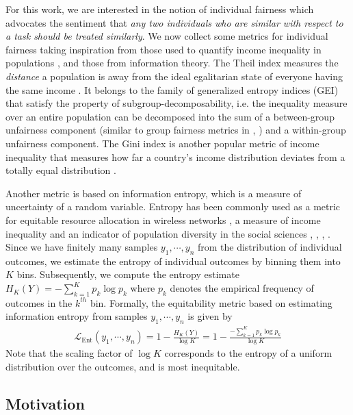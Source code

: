\documentclass[sigconf]{acmart}
\begin{document}
For this work, we are interested in the notion of individual fairness which advocates the sentiment that \textit{any two individuals who are similar with respect to a task should be treated similarly}. We now collect some metrics for individual fairness taking inspiration from those used to quantify income inequality in populations \cite{inequalityindices}, and those from information theory. The Theil index measures the \textit{distance} a population is away from the ideal egalitarian state of everyone having the same income \cite{htheil}. It belongs to the family of generalized entropy indices (GEI) that satisfy the property of subgroup-decomposability, i.e. the inequality measure over an entire population can be decomposed into the sum of a between-group unfairness component (similar to group fairness metrics in \cite{dwork2012fairness}, \cite{aif360}) and a within-group unfairness component. The Gini index is another popular metric of income inequality that measures how far a country's income distribution deviates from a totally equal distribution \cite{gini}. 

Another metric is based on information entropy, which is a measure of uncertainty of a random variable. Entropy has been commonly used as a metric for equitable resource allocation in wireless networks \cite{FairnessMetric}, a measure of income inequality and an indicator of population diversity in the social sciences \cite{segregation}, \cite{diversity}, \cite{Balch2000HierarchicSE}, \cite{TuckerThesis}. Since we have finitely many samples $y_1,\cdots,y_n$ from the distribution of individual outcomes, we estimate the entropy of individual outcomes by binning them into $K$ bins. Subsequently, we compute the entropy estimate $H_K(Y)=-\sum_{k=1}^Kp_k\log p_k$ where $p_k$ denotes the empirical frequency of outcomes in the $k^{th}$ bin. Formally, the equitability metric based on estimating information entropy from samples $y_1,\cdots,y_n$ is given by\begin{align}
    \mathcal{L}_{\mathrm{Ent}}(y_1,\cdots,y_n)=1-\frac{H_K(Y)}{\log K}=1-\frac{-\sum_{k=1}^Kp_k\log p_k}{\log K}\label{eq:ent}
\end{align}
Note that the scaling factor of $\log K$ corresponds to the entropy of a uniform distribution over the outcomes, and is most inequitable.

\subsection{Motivation\label{subsec:motivation}}
\end{document}
